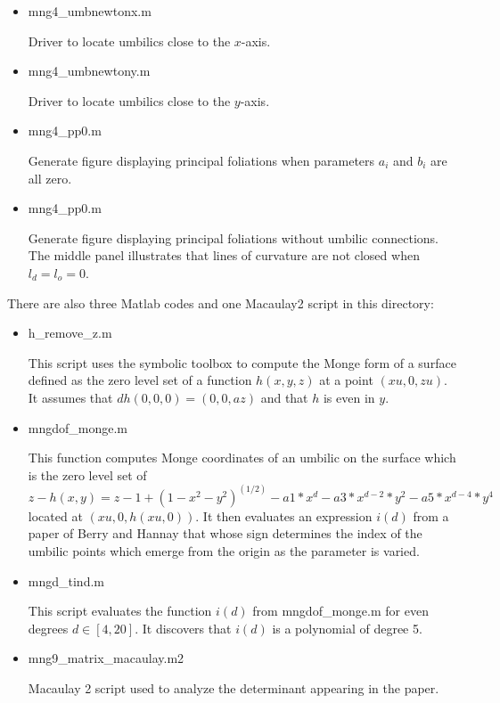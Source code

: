 \documentclass{article}[12pt]
\begin{document}
\begin{itemize}
\item
mng4\_umbnewtonx.m

Driver to locate umbilics close to the $x$-axis.

\item
mng4\_umbnewtony.m

Driver to locate umbilics close to the $y$-axis.

\item
mng4\_pp0.m

Generate figure displaying principal foliations when parameters $a_i$ and $b_i$ are all zero.

\item
mng4\_pp0.m

Generate figure displaying principal foliations without umbilic connections. The middle panel illustrates that lines of curvature are not closed when $l_d = l_o = 0$.

\end{itemize}

There are also three Matlab codes and one Macaulay2 script  in this directory:

\begin{itemize}
\item
h\_remove\_z.m

This script uses the symbolic toolbox to compute the Monge form of a surface defined as the zero level set of a function $h(x,y,z)$ at a point $(xu,0,zu)$.
It assumes that $dh(0,0,0) = (0,0,az)$ and that $h$ is even in $y$.

\item
mngdof\_monge.m

This function computes Monge coordinates of an umbilic on the surface which is the zero level set of
$$z - h(x,y) = z - 1 + (1 - x^2 - y^2)^{(1/2)} - a1*x^d - a3*x^{d-2}*y^2 - a5*x^{d-4}*y^4$$
located at $(xu,0,h(xu,0))$. It then evaluates an expression $i(d)$ from a paper of Berry and Hannay that 
whose sign determines the index of the umbilic points which emerge from the origin as the parameter is varied.

\item
mngd\_tind.m

This script evaluates the function $i(d)$ from mngdof\_monge.m for even degrees $d \in [4,20]$. It discovers that
$i(d)$ is a polynomial of degree 5.
 
\item
mng9\_matrix\_macaulay.m2

Macaulay 2 script used to analyze the determinant appearing in the paper.

\end{itemize}
\end{document}
